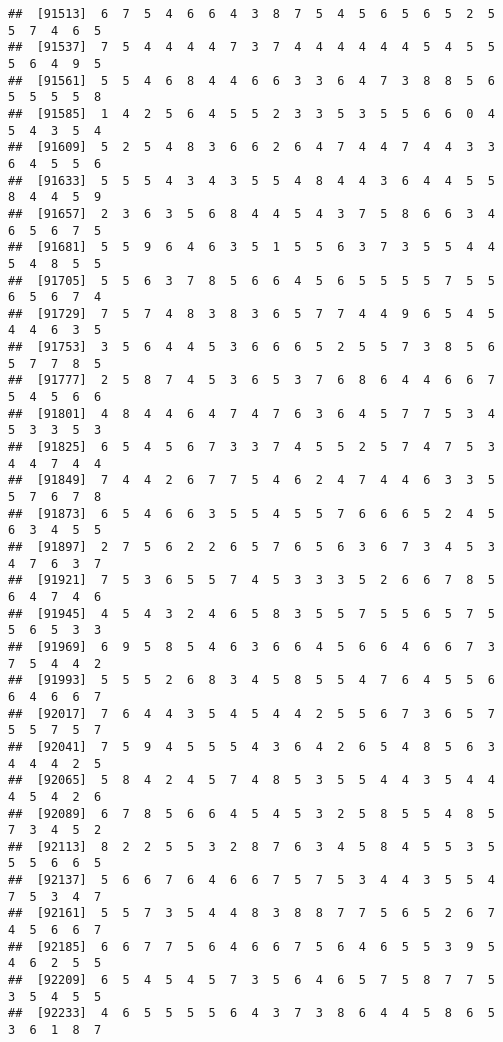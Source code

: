 \documentclass[
]{book}
\begin{document}
\begin{verbatim}
##  [91513]  6  7  5  4  6  6  4  3  8  7  5  4  5  6  5  6  5  2  5  5  7  4  6  5
##  [91537]  7  5  4  4  4  4  7  3  7  4  4  4  4  4  4  5  4  5  5  5  6  4  9  5
##  [91561]  5  5  4  6  8  4  4  6  6  3  3  6  4  7  3  8  8  5  6  5  5  5  5  8
##  [91585]  1  4  2  5  6  4  5  5  2  3  3  5  3  5  5  6  6  0  4  5  4  3  5  4
##  [91609]  5  2  5  4  8  3  6  6  2  6  4  7  4  4  7  4  4  3  3  6  4  5  5  6
##  [91633]  5  5  5  4  3  4  3  5  5  4  8  4  4  3  6  4  4  5  5  8  4  4  5  9
##  [91657]  2  3  6  3  5  6  8  4  4  5  4  3  7  5  8  6  6  3  4  6  5  6  7  5
##  [91681]  5  5  9  6  4  6  3  5  1  5  5  6  3  7  3  5  5  4  4  5  4  8  5  5
##  [91705]  5  5  6  3  7  8  5  6  6  4  5  6  5  5  5  5  7  5  5  6  5  6  7  4
##  [91729]  7  5  7  4  8  3  8  3  6  5  7  7  4  4  9  6  5  4  5  4  4  6  3  5
##  [91753]  3  5  6  4  4  5  3  6  6  6  5  2  5  5  7  3  8  5  6  5  7  7  8  5
##  [91777]  2  5  8  7  4  5  3  6  5  3  7  6  8  6  4  4  6  6  7  5  4  5  6  6
##  [91801]  4  8  4  4  6  4  7  4  7  6  3  6  4  5  7  7  5  3  4  5  3  3  5  3
##  [91825]  6  5  4  5  6  7  3  3  7  4  5  5  2  5  7  4  7  5  3  4  4  7  4  4
##  [91849]  7  4  4  2  6  7  7  5  4  6  2  4  7  4  4  6  3  3  5  5  7  6  7  8
##  [91873]  6  5  4  6  6  3  5  5  4  5  5  7  6  6  6  5  2  4  5  6  3  4  5  5
##  [91897]  2  7  5  6  2  2  6  5  7  6  5  6  3  6  7  3  4  5  3  4  7  6  3  7
##  [91921]  7  5  3  6  5  5  7  4  5  3  3  3  5  2  6  6  7  8  5  6  4  7  4  6
##  [91945]  4  5  4  3  2  4  6  5  8  3  5  5  7  5  5  6  5  7  5  5  6  5  3  3
##  [91969]  6  9  5  8  5  4  6  3  6  6  4  5  6  6  4  6  6  7  3  7  5  4  4  2
##  [91993]  5  5  5  2  6  8  3  4  5  8  5  5  4  7  6  4  5  5  6  6  4  6  6  7
##  [92017]  7  6  4  4  3  5  4  5  4  4  2  5  5  6  7  3  6  5  7  5  5  7  5  7
##  [92041]  7  5  9  4  5  5  5  4  3  6  4  2  6  5  4  8  5  6  3  4  4  4  2  5
##  [92065]  5  8  4  2  4  5  7  4  8  5  3  5  5  4  4  3  5  4  4  4  5  4  2  6
##  [92089]  6  7  8  5  6  6  4  5  4  5  3  2  5  8  5  5  4  8  5  7  3  4  5  2
##  [92113]  8  2  2  5  5  3  2  8  7  6  3  4  5  8  4  5  5  3  5  5  5  6  6  5
##  [92137]  5  6  6  7  6  4  6  6  7  5  7  5  3  4  4  3  5  5  4  7  5  3  4  7
##  [92161]  5  5  7  3  5  4  4  8  3  8  8  7  7  5  6  5  2  6  7  4  5  6  6  7
##  [92185]  6  6  7  7  5  6  4  6  6  7  5  6  4  6  5  5  3  9  5  4  6  2  5  5
##  [92209]  6  5  4  5  4  5  7  3  5  6  4  6  5  7  5  8  7  7  5  3  5  4  5  5
##  [92233]  4  6  5  5  5  5  6  4  3  7  3  8  6  4  4  5  8  6  5  3  6  1  8  7

\end{verbatim}
\end{document}
